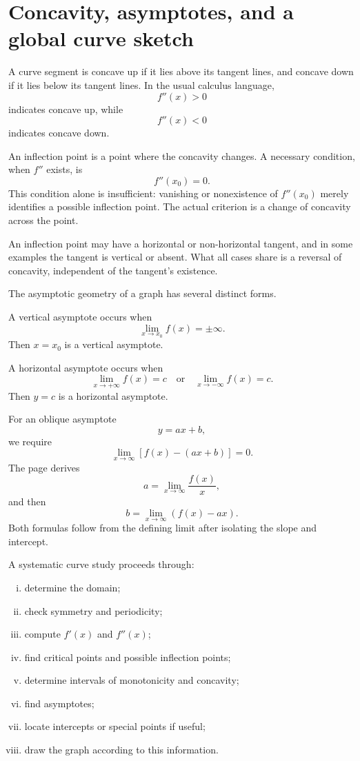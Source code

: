 \section{Concavity, asymptotes, and a global curve sketch}

A curve segment is concave up if it lies above its tangent lines, and concave down if it lies below its tangent lines.  In the usual calculus language,
\[
  f''(x)>0
\]
indicates concave up, while
\[
  f''(x)<0
\]
indicates concave down.

An inflection point is a point where the concavity changes.  A necessary condition, when $f''$ exists, is
\[
  f''(x_0)=0.
\]
This condition alone is insufficient: vanishing or nonexistence of $f''(x_0)$ merely identifies a possible inflection point. The actual criterion is a change of concavity across the point.

An inflection point may have a horizontal or non-horizontal tangent, and in some examples the tangent is vertical or absent. What all cases share is a reversal of concavity, independent of the tangent's existence.

The asymptotic geometry of a graph has several distinct forms.

A vertical asymptote occurs when
\[
  \lim_{x\to x_0}f(x)=\pm\infty.
\]
Then $x=x_0$ is a vertical asymptote.

A horizontal asymptote occurs when
\[
  \lim_{x\to+\infty}f(x)=c
  \quad\text{or}\quad
  \lim_{x\to-\infty}f(x)=c.
\]
Then $y=c$ is a horizontal asymptote.

For an oblique asymptote
\[
  y=ax+b,
\]
we require
\[
  \lim_{x\to\infty}[f(x)-(ax+b)]=0.
\]
The page derives
\[
  a=\lim_{x\to\infty}
\frac{f(x)}x,
\]
and then
\[
  b=\lim_{x\to\infty}(f(x)-ax).
\]
Both formulas follow from the defining limit after isolating the slope and intercept.

A systematic curve study proceeds through:

\begin{enumerate}[(i)]
  \item determine the domain;
  \item check symmetry and periodicity;
  \item compute $f'(x)$ and $f''(x)$;
  \item find critical points and possible inflection points;
  \item determine intervals of monotonicity and concavity;
  \item find asymptotes;
  \item locate intercepts or special points if useful;
  \item draw the graph according to this information.
\end{enumerate}

